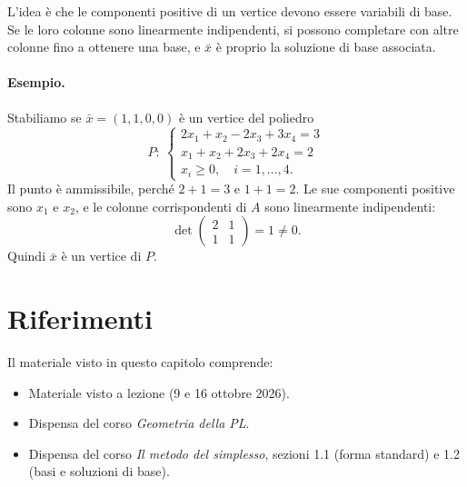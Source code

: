 L'idea è che le componenti positive di un vertice devono essere variabili di base. Se le loro colonne sono linearmente indipendenti, si possono completare con altre colonne fino a ottenere una base, e $\bar{x}$ è proprio la soluzione di base associata.

\paragraph{Esempio.}
Stabiliamo se $\bar{x} = (1, 1, 0, 0)$ è un vertice del poliedro
\[
P:\ \begin{cases}
2x_1 + x_2 - 2x_3 + 3x_4 = 3 \\
x_1 + x_2 + 2x_3 + 2x_4 = 2 \\
x_i \ge 0, \quad i = 1, \dots, 4.
\end{cases}
\]
Il punto è ammissibile, perché $2 + 1 = 3$ e $1 + 1 = 2$. Le sue componenti positive sono $x_1$ e $x_2$, e le colonne corrispondenti di $A$ sono linearmente indipendenti:
\[
\det \begin{pmatrix} 2 & 1 \\ 1 & 1 \end{pmatrix} = 1 \neq 0.
\]
Quindi $\bar{x}$ è un vertice di $P$.

\section*{Riferimenti}
Il materiale visto in questo capitolo comprende:
\begin{itemize}
    \item Materiale visto a lezione (9 e 16 ottobre 2026).
    \item Dispensa del corso \emph{Geometria della PL}.
    \item Dispensa del corso \emph{Il metodo del simplesso}, sezioni 1.1 (forma standard) e 1.2 (basi e soluzioni di base).
\end{itemize}
